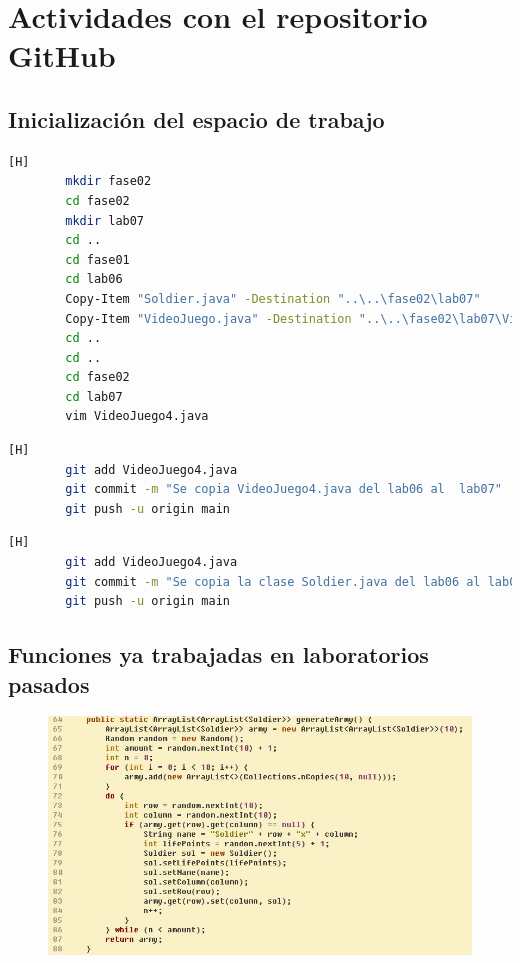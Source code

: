 \documentclass{article}
\begin{document}
	\section{Actividades con el repositorio GitHub}
	


	\subsection{Inicialización del espacio de trabajo}
	
	\begin{lstlisting}[language=bash,caption={Inicializando el espacio de trabajo}][H]
		mkdir fase02
		cd fase02
		mkdir lab07
		cd ..
		cd fase01
		cd lab06
		Copy-Item "Soldier.java" -Destination "..\..\fase02\lab07"
		Copy-Item "VideoJuego.java" -Destination "..\..\fase02\lab07\VideoJueg04.java"
		cd ..
		cd ..
		cd fase02
		cd lab07
		vim VideoJuego4.java	
	\end{lstlisting}
	
	\begin{lstlisting}[language=bash,caption={Commit: 82bbf967de5142fdae59eac06dc2ed0cc640dd29 }][H]
		git add VideoJuego4.java
		git commit -m "Se copia VideoJuego4.java del lab06 al  lab07"
		git push -u origin main
	\end{lstlisting}
	
	\begin{lstlisting}[language=bash,caption={Commit: cf47e16c148de6bf8c57a1bb7d671ff4e5772537 }][H]
		git add VideoJuego4.java
		git commit -m "Se copia la clase Soldier.java del lab06 al lab07"
		git push -u origin main
	\end{lstlisting}
	
	
	
	
	
	
	
	
	\subsection{Funciones ya trabajadas en laboratorios pasados}

	\begin{figure}[H]
		\centering
		\includegraphics[width=1\textwidth,keepaspectratio]{img/generateArmy.jpg}
	\end{figure}
	
\end{document}
